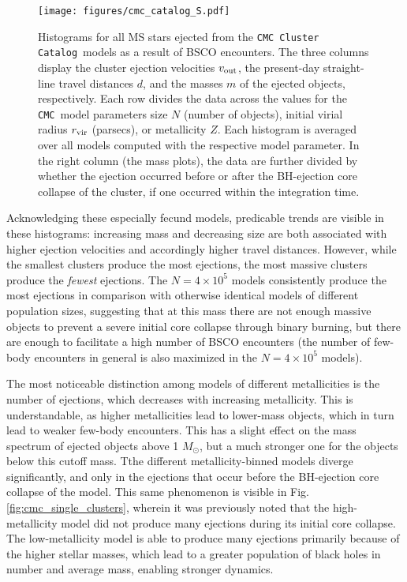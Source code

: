 \documentclass[twocolumn]{aastex631}
\newcommand{\CMC}{\texttt{CMC}}
\newcommand{\CMCcat}{\texttt{CMC Cluster Catalog}}
\begin{document}
\begin{figure*}
    \centering
    \texttt{[image: figures/cmc\_catalog\_S.pdf]}
    \caption{
        Histograms for all MS stars ejected from the \CMCcat\ models as a result of BSCO encounters.
        The three columns display the cluster ejection velocities $v_{\rm out}$, the present-day straight-line travel distances $d$, and the masses $m$ of the ejected objects, respectively.
        Each row divides the data across the values for the \CMC\ model parameters size $N$ (number of objects), initial virial radius $r_{\rm vir}$ (parsecs), or metallicity $Z$.
        Each histogram is averaged over all models computed with the respective model parameter.
        In the right column (the mass plots), the data are further divided by whether the ejection occurred before or after the BH-ejection core collapse of the cluster, if one occurred within the integration time.
    }
    \label{fig:cmc_catalog}
\end{figure*}

Acknowledging these especially fecund models, predicable trends are visible in these histograms: increasing mass and decreasing size are both associated with higher ejection velocities and accordingly higher travel distances.
However, while the smallest clusters produce the most ejections, the most massive clusters produce the \textit{fewest} ejections.
The $N = 4 \times 10^5$ models consistently produce the most ejections in comparison with otherwise identical models of different population sizes, suggesting that at this mass there are not enough massive objects to prevent a severe initial core collapse through binary burning, but there are enough to facilitate a high number of BSCO encounters (the number of few-body encounters in general is also maximized in the $N = 4 \times 10^5$ models).

The most noticeable distinction among models of different metallicities is the number of ejections, which decreases with increasing metallicity.
This is understandable, as higher metallicities lead to lower-mass objects, which in turn lead to weaker few-body encounters.
This has a slight effect on the mass spectrum of ejected objects above 1 $M_\odot$, but a much stronger one for the objects below this cutoff mass.
Tthe different metallicity-binned models diverge significantly, and only in the ejections that occur before the BH-ejection core collapse of the model.
This same phenomenon is visible in Fig. \ref{fig:cmc_single_clusters}, wherein it was previously noted that the high-metallicity model did not produce many ejections during its initial core collapse.
The low-metallicity model is able to produce many ejections primarily because of the higher stellar masses, which lead to a greater population of black holes in number and average mass, enabling stronger dynamics.
\end{document}
